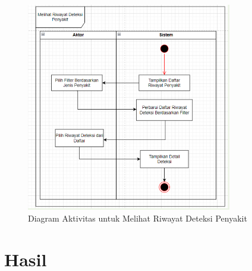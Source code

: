 \documentclass[journal,article,submit,pdftex,moreauthors]{Definitions/mdpi}
\begin{document}
\begin{enumerate}[label=\alph*)]
    \begin{figure}[H]
        \centering
        \includegraphics[width=0.8\textwidth]{Images/activity_history.png}
        \caption{\centering Diagram Aktivitas untuk Melihat Riwayat Deteksi Penyakit}
        \label{fig:activity-view-history}
    \end{figure}
\end{enumerate}

\section{Hasil}
\end{document}
